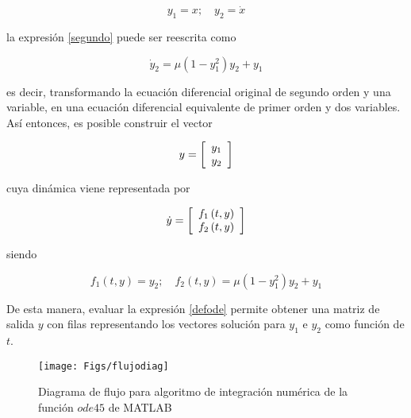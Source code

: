 $$y_1 = x; \quad y_2 = \dot{x}$$

\noindent la expresión \eqref{segundo} puede ser reescrita como

$$
\dot{y}_2 = \mu \left( 1 - y_1^2 \right) y_2 + y_1
$$

\noindent es decir, transformando la ecuación diferencial original de segundo orden y una variable, en una ecuación diferencial equivalente de primer orden y dos variables. Así entonces, es posible construir el vector

$$
y = \left[ {\begin{array}{*{20}c}
   y_1  \\
   y_2  \\
\end{array}} \right]
$$

\noindent cuya dinámica viene representada por

$$
\dot{y} = \left[ {\begin{array}{*{20}c}
   f_1 \left(t, y \right)  \\
   f_2 \left(t, y \right) \\
\end{array}} \right]
$$

\noindent siendo

$$f_1\left(t, y \right) = y_2; \quad f_2\left(t, y \right) =  \mu \left( 1 - y_1^2 \right) y_2 + y_1$$

De esta manera, evaluar la expresión \eqref{defode} permite obtener una matriz de salida $y$ con filas representando los vectores solución para $y_1$ e $y_2$ como función de $t$.\\

\begin{figure}[h]
\centering
\caption[]{Diagrama de flujo para algoritmo de integración numérica de la función $ode45$ de MATLAB}\label{flujodiag}
\texttt{[image: Figs/flujodiag]}
\end{figure}

